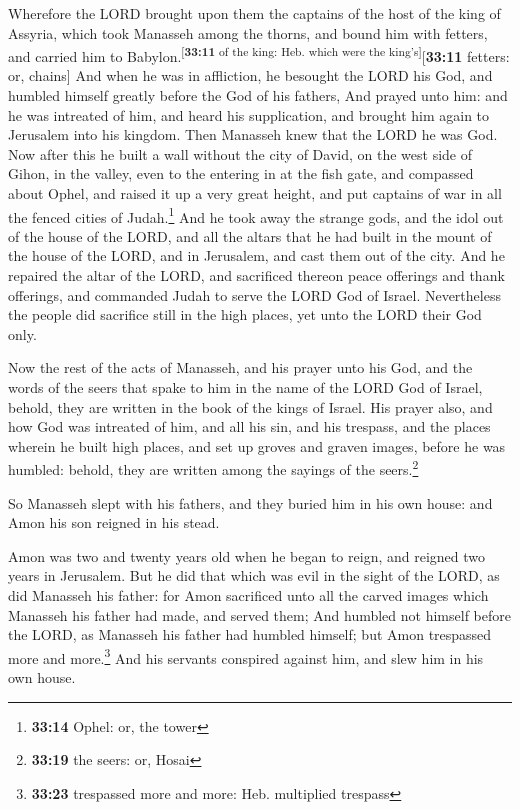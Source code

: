  Wherefore the LORD brought upon them the captains of the
host of the king of Assyria, which took Manasseh among the thorns, and
bound him with fetters, and carried him to
Babylon.\textsuperscript{{[}\textbf{33:11} of the king: Heb. which were
the king's{]}}{[}\textbf{33:11} fetters: or, chains{]} 
And when he was in affliction, he besought the LORD his God, and humbled
himself greatly before the God of his fathers,  And
prayed unto him: and he was intreated of him, and heard his
supplication, and brought him again to Jerusalem into his kingdom. Then
Manasseh knew that the LORD he was God.  Now after this
he built a wall without the city of David, on the west side of Gihon, in
the valley, even to the entering in at the fish gate, and compassed
about Ophel, and raised it up a very great height, and put captains of
war in all the fenced cities of Judah.\footnote{\textbf{33:14} Ophel:
  or, the tower}  And he took away the strange gods, and
the idol out of the house of the LORD, and all the altars that he had
built in the mount of the house of the LORD, and in Jerusalem, and cast
them out of the city.  And he repaired the altar of the
LORD, and sacrificed thereon peace offerings and thank offerings, and
commanded Judah to serve the LORD God of Israel. 
Nevertheless the people did sacrifice still in the high places, yet unto
the LORD their God only.

 Now the rest of the acts of Manasseh, and his prayer
unto his God, and the words of the seers that spake to him in the name
of the LORD God of Israel, behold, they are written in the book of the
kings of Israel.  His prayer also, and how God was
intreated of him, and all his sin, and his trespass, and the places
wherein he built high places, and set up groves and graven images,
before he was humbled: behold, they are written among the sayings of the
seers.\footnote{\textbf{33:19} the seers: or, Hosai}

 So Manasseh slept with his fathers, and they buried him
in his own house: and Amon his son reigned in his stead.

 Amon was two and twenty years old when he began to
reign, and reigned two years in Jerusalem.  But he did
that which was evil in the sight of the LORD, as did Manasseh his
father: for Amon sacrificed unto all the carved images which Manasseh
his father had made, and served them;  And humbled not
himself before the LORD, as Manasseh his father had humbled himself; but
Amon trespassed more and more.\footnote{\textbf{33:23} trespassed more
  and more: Heb. multiplied trespass}  And his servants
conspired against him, and slew him in his own house.

